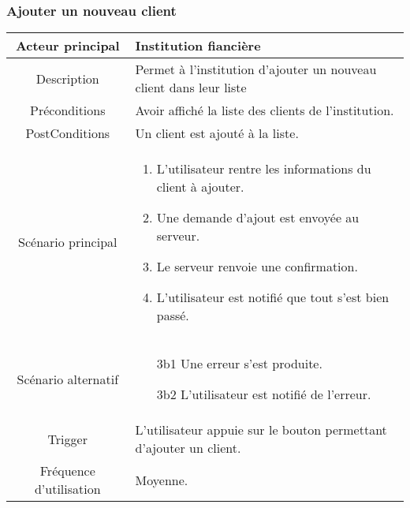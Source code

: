 \documentclass{article}
\begin{document}
\subsubsection{Ajouter un nouveau client}
\begin{table}[h]
   \begin{tabular}{|c|p{10cm}|}
      \hline
      Acteur principal&Institution fiancière\\
      \hline
      Description&Permet à l'institution d'ajouter un nouveau client dans leur liste\\
      \hline
      Préconditions&Avoir affiché la liste des clients de l'institution.\\
      \hline
      PostConditions&Un client est ajouté à la liste.\\
      \hline
      Scénario principal& 
            \begin{enumerate}
               \item L'utilisateur rentre les informations du client à ajouter.
               \item Une demande d'ajout est envoyée au serveur.
               \item Le serveur renvoie une confirmation.
               \item L'utilisateur est notifié que tout s'est bien passé.
            \end{enumerate}     \\
      \hline
      Scénario alternatif&
            \begin{itemize}
               \item[3b1] Une erreur s'est produite.
               \item[3b2] L'utilisateur est notifié de l'erreur.  
            \end{itemize}\\
      \hline
      Trigger&L'utilisateur appuie sur le bouton permettant d'ajouter un client.\\
      \hline
      Fréquence d'utilisation&Moyenne.\\
      \hline
   \end{tabular}
\end{table}

\newpage
\end{document}
